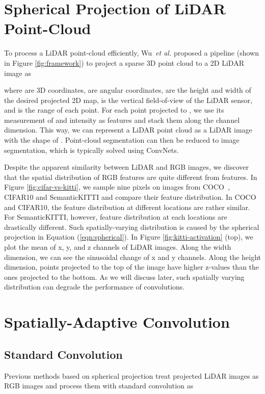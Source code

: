 \documentclass[runningheads]{llncs}
\begin{document}
\section{Spherical Projection of LiDAR Point-Cloud}
To process a LiDAR point-cloud efficiently, Wu~\textit{et al.} \cite{wu2017squeezeseg} proposed a pipeline (shown in Figure \ref{fig:framework}) to project a sparse 3D point cloud to a 2D LiDAR image as

where  are 3D coordinates,  are angular coordinates,  are the height and width of the desired projected 2D map,  is the vertical field-of-view of the LiDAR sensor, and  is the range of each point. For each point projected to , we use its measurement of  and intensity as features and stack them along the channel dimension. This way, we can represent a LiDAR point cloud as a LiDAR image with the shape of . Point-cloud segmentation can then be reduced to image segmentation, which is typically solved using ConvNets.  


Despite the apparent similarity between LiDAR and RGB images, we discover that the spatial distribution of RGB features are quite different from  features. In Figure \ref{fig:cifar-vs-kitti}, we sample nine pixels on images from COCO~\cite{lin2014microsoft}, CIFAR10 \cite{krizhevsky2009learning} and SemanticKITTI \cite{behley2019iccv} and compare their feature distribution. In COCO and CIFAR10, the feature distribution at different locations are rather similar. For SemanticKITTI, however, feature distribution at each locations are drastically different. Such spatially-varying distribution is caused by the spherical projection in Equation (\ref{eqn:spherical}). In Figure \ref{fig:kitti-activation} (top), we plot the mean of x, y, and z channels of LiDAR images. Along the width dimension, we can see the sinusoidal change of x and y channels. Along the height dimension, points projected to the top of the image have higher z-values than the ones projected to the bottom. As we will discuss later, such spatially varying distribution can degrade the performance of convolutions. 


\section{Spatially-Adaptive Convolution}
\subsection{Standard Convolution}
Previous methods based on spherical projection \cite{wu2017squeezeseg,wu2018squeezesegv2,milioto2019rangenet++} treat projected LiDAR images as RGB images and process them with standard convolution as
\end{document}
